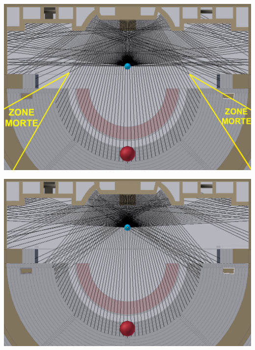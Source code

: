 \begin{figureth}
	\begin{subfigureth}{0.48\textwidth}
		\includegraphics[width=\linewidth]{images/test_source1}
		\caption{Reflexion des rayons sur le mur de scène pour une source située en [0 ; 3,6 ; 42,8].}
		\label{test_source1}
		\hfill
		\quad
	\end{subfigureth}
	\quad
	\begin{subfigureth}{0.48\textwidth}
		\includegraphics[width=\linewidth]{images/test_source2}
		\caption{Reflexion des rayons sur le mur de scène pour une source située en [0 ; 9 ; 42,8].}
		\label{test_source2}
		\quad
	\end{subfigureth} 
	\begin{subfigureth}{0.48\textwidth}

\end{subfigureth}
\end{figureth}
